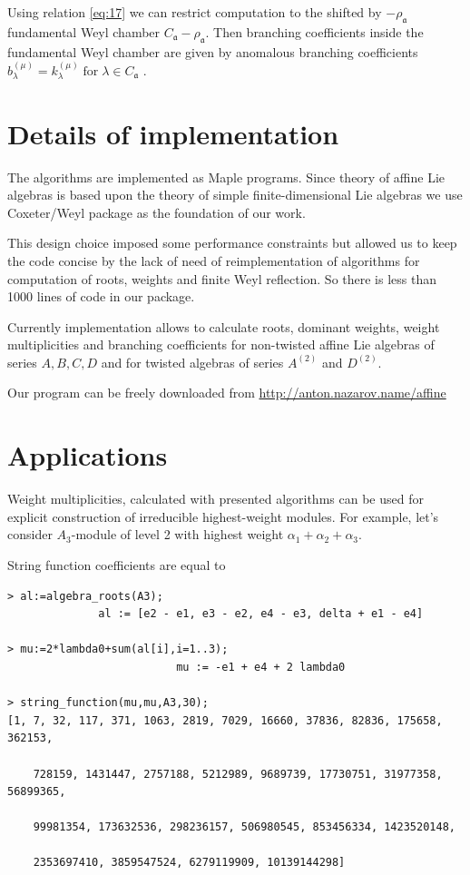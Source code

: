\documentclass[a4paper,12pt]{article}
\theoremstyle{definition} \newtheorem{Def}{Definition}
\begin{document}
Using relation \eqref{eq:17} we can restrict computation to the shifted by $-\rho_{\mathfrak{a}}$ fundamental Weyl chamber $C_{\mathfrak{a}}-\rho_{\mathfrak{a}}$. Then branching coefficients inside the fundamental Weyl chamber are given by anomalous branching coefficients $b_{\lambda}^{(\mu)}=k_{\lambda}^{(\mu)}\;\mbox{for}\;\lambda\in C_{\mathfrak{a}}$ \cite{ilyin812pbc}.
\section{Details of implementation}
\label{sec:details-implementation}

The algorithms are implemented as Maple programs. Since theory of
affine Lie algebras is based upon the theory of simple
finite-dimensional Lie algebras we use Coxeter/Weyl package
\cite{stembridge1995mps} as the foundation of our work.

This design choice imposed some performance constraints but allowed us
to keep the code concise by the lack of need of reimplementation of
algorithms for computation of roots, weights and finite Weyl
reflection. So there is less than 1000 lines of code in our package.

Currently implementation allows to calculate roots, dominant weights,
weight multiplicities and branching coefficients for non-twisted
affine Lie algebras of series $A,B,C,D$ and for twisted algebras of
series $A^{(2)}$ and $D^{(2)}$.

Our program can be freely downloaded from \url{http://anton.nazarov.name/affine}

\section{Applications}
\label{sec:applications}

Weight multiplicities, calculated with presented algorithms can be
used for explicit construction of irreducible highest-weight modules.
For example, let's consider $A_3$-module of level 2 with highest
weight $\alpha_1+\alpha_2+\alpha_3$. 

String function coefficients are equal to
\begin{verbatim}
> al:=algebra_roots(A3);
              al := [e2 - e1, e3 - e2, e4 - e3, delta + e1 - e4]

> mu:=2*lambda0+sum(al[i],i=1..3);
                          mu := -e1 + e4 + 2 lambda0

> string_function(mu,mu,A3,30);
[1, 7, 32, 117, 371, 1063, 2819, 7029, 16660, 37836, 82836, 175658, 362153,

    728159, 1431447, 2757188, 5212989, 9689739, 17730751, 31977358, 56899365,

    99981354, 173632536, 298236157, 506980545, 853456334, 1423520148,

    2353697410, 3859547524, 6279119909, 10139144298]
\end{verbatim}
\end{document}
